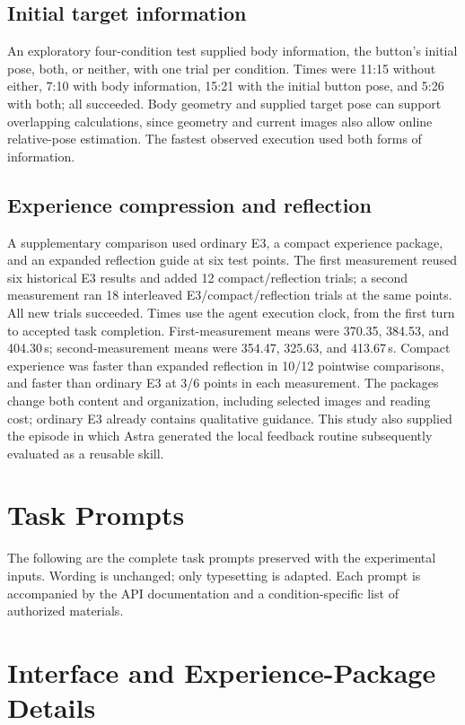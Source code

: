 \documentclass[11pt]{article}
\begin{document}
\subsection{Initial target information}
An exploratory four-condition test supplied body information, the button's initial pose, both, or neither, with one trial per condition. Times were 11:15 without either, 7:10 with body information, 15:21 with the initial button pose, and 5:26 with both; all succeeded. Body geometry and supplied target pose can support overlapping calculations, since geometry and current images also allow online relative-pose estimation. The fastest observed execution used both forms of information.

\subsection{Experience compression and reflection}\label{app:reflection}
A supplementary comparison used ordinary E3, a compact experience package, and an expanded reflection guide at six test points. The first measurement reused six historical E3 results and added 12 compact/reflection trials; a second measurement ran 18 interleaved E3/compact/reflection trials at the same points. All new trials succeeded. Times use the agent execution clock, from the first turn to accepted task completion. First-measurement means were 370.35, 384.53, and 404.30\,s; second-measurement means were 354.47, 325.63, and 413.67\,s. Compact experience was faster than expanded reflection in 10/12 pointwise comparisons, and faster than ordinary E3 at 3/6 points in each measurement. The packages change both content and organization, including selected images and reading cost; ordinary E3 already contains qualitative guidance. This study also supplied the episode in which Astra generated the local feedback routine subsequently evaluated as a reusable skill.


\section{Task Prompts}\label{app:prompts}
The following are the complete task prompts preserved with the experimental inputs. Wording is unchanged; only typesetting is adapted. Each prompt is accompanied by the API documentation and a condition-specific list of authorized materials.


\section{Interface and Experience-Package Details}\label{app:interface}
\end{document}
